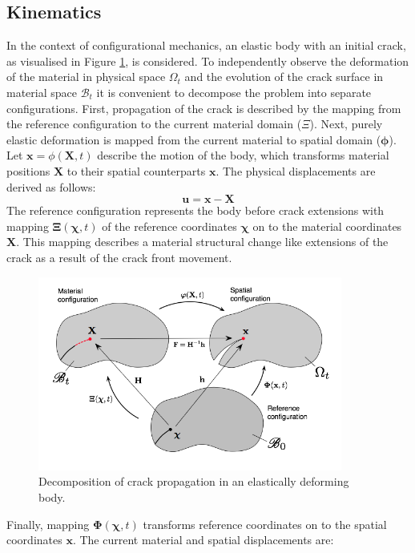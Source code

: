 \documentclass[11pt]{ACMEarticle}
\numberwithin{equation}{section}
\begin{document}
\subsection{Kinematics}
In the context of configurational mechanics, an elastic body with an initial crack, as visualised in Figure \ref{fig:frac_kinematics}, is considered. To independently observe the deformation of the material in physical space $\Omega_t$ and the evolution of the crack surface in material space $\mathcal B_t $ it is convenient to decompose the problem into separate configurations. First, propagation of the crack is described by the mapping from the reference configuration to the current material domain ($\Xi$). Next, purely elastic deformation is mapped from the current material to spatial domain ($\mathbf \phi$). Let $\mathbf x = \phi(\mathbf X,t)$ describe the motion of the body, which transforms material positions $\mathbf X$ to their spatial counterparts $\mathbf x$. The physical displacements are derived as follows:
\begin{equation}
\mathbf u = \mathbf x - \mathbf X
\end{equation}
The reference configuration represents the body before crack extensions with mapping $\mathbf \Xi( \mathbf \chi, t)$ of the reference coordinates $\mathbf \chi$ on to the material coordinates $\mathbf X$. This mapping describes a material structural change like extensions of the crack as a result of the crack front movement. 
\begin{figure}[h!]
	\begin{centering}
		\includegraphics[width=10cm]{Figures/frac_kinematics}
		\caption{Decomposition of crack propagation in an elastically deforming body.}
		\label{fig:frac_kinematics}
	\end{centering}
\end{figure}
Finally, mapping $\mathbf \Phi (\mathbf \chi,t)$ transforms reference coordinates on to the spatial coordinates $\mathbf x$. The current material and spatial displacements are:
\end{document}
